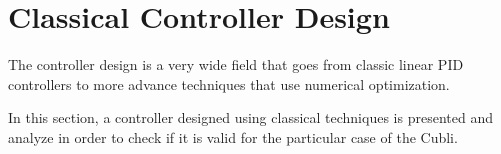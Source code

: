 \chapter{Classical Controller Design}\label{chap:controllerDesign}
The controller design is a very wide field that goes from classic linear PID controllers to more advance techniques that use numerical optimization.

In this section, a controller designed using classical techniques is presented and analyze in order to check if it is valid for the particular case of the Cubli. 